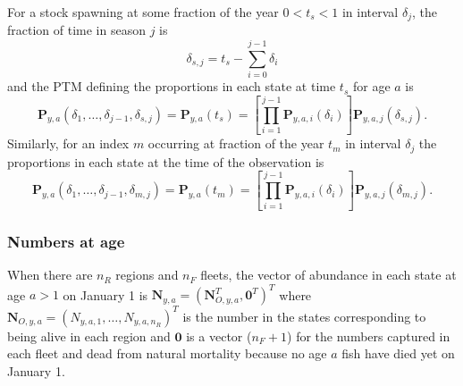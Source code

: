\documentclass[
]{article}
\begin{document}
For a stock spawning at some fraction of the year \(0<t_s<1\) in interval \(\delta_j\), the fraction of time in season \(j\) is
\[\delta_{s,j} = t_s-\sum^{j-1}_{i=0}\delta_i
\]
and the PTM defining the proportions in each state at time \(t_s\) for age \(a\) is
\begin{equation}\label{eq:ptm_spawn}
\mathbf{P}_{y,a}\left(\delta_1,\ldots,\delta_{j-1}, \delta_{s,j}\right) = \mathbf{P}_{y,a}\left(t_s\right) =  \left[\prod^{j-1}_{i=1}\mathbf{P}_{y,a,i}(\delta_i)\right]\mathbf{P}_{y,a,j}(\delta_{s,j}).
\end{equation}
Similarly, for an index \(m\) occurring at fraction of the year \(t_m\) in interval \(\delta_j\) the proportions in each state at the time of the observation is
\begin{equation} \label{eq:ptm_index} 
\mathbf{P}_{y,a}\left(\delta_1,\ldots,\delta_{j-1}, \delta_{m,j}\right) = \mathbf{P}_{y,a}\left(t_m\right) =   \left[\prod^{j-1}_{i=1}\mathbf{P}_{y,a,i}(\delta_i)\right]\mathbf{P}_{y,a,j}(\delta_{m,j}).
\end{equation}

\hypertarget{numbers-at-age}{%
\subsubsection*{Numbers at age}\label{numbers-at-age}}

When there are \(n_R\) regions and \(n_F\) fleets, the vector of abundance in each state at age \(a>1\) on January 1 is \(\mathbf{N}_{y,a} = (\mathbf{N}_{O,y,a}^T, \mathbf{0}^T)^T\) where \(\mathbf{N}_{O,y,a} = (N_{y,a,1}, \ldots, N_{y,a,n_R})^T\) is the number in the states corresponding to being alive in each region and \(\mathbf{0}\) is a vector (\(n_F+1\)) for the numbers captured in each fleet and dead from natural mortality because no age \(a\) fish have died yet on January 1.
\end{document}
